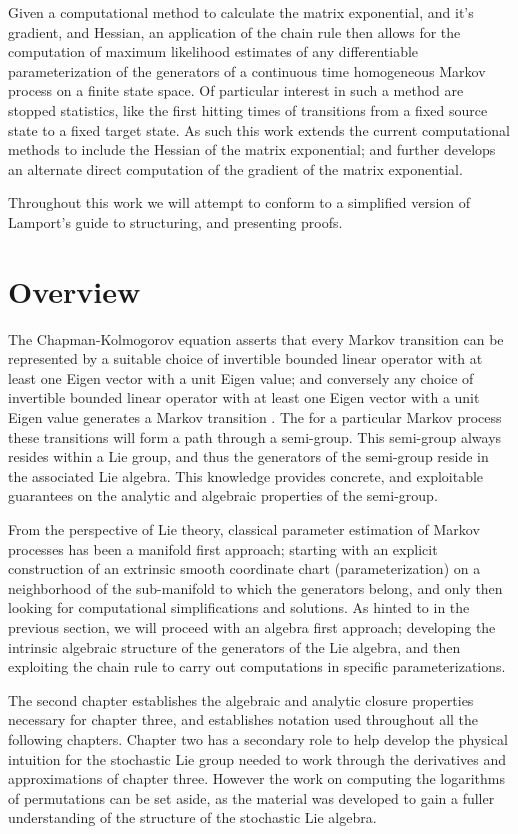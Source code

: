 Given a computational method to calculate the matrix exponential, and it's gradient, and
Hessian, an application of the chain rule then allows for the computation of maximum
likelihood estimates of any differentiable parameterization of the generators of a
continuous time homogeneous Markov process on a finite state space. Of particular interest
in such a method are stopped statistics, like the first hitting times of transitions from a
fixed source state to a fixed target state. As such this work extends the current
computational methods to include the Hessian of the matrix exponential; and further develops
an alternate direct computation of the gradient of the matrix exponential.

Throughout this work we will attempt to conform to a simplified version of Lamport's guide
to structuring, and presenting proofs\cite{lamport_how_2012}.
\section{Overview}
The Chapman-Kolmogorov equation asserts that every Markov transition can be represented by 
a suitable choice of invertible bounded linear operator with at least one Eigen vector with 
a unit Eigen value; and conversely any choice of invertible bounded linear operator with at
least one Eigen vector with a unit Eigen value generates a Markov transition \cite{rogers_diffusions_2000}.
The for a particular Markov process these transitions will form a path through a semi-group.
This semi-group always resides within a Lie group, and thus the generators of the semi-group
reside in the associated Lie algebra. This knowledge provides concrete, and exploitable 
guarantees on the analytic and algebraic properties of the semi-group.

From the perspective of Lie theory, classical parameter estimation of Markov processes has
been a manifold first approach; starting with an explicit construction of an extrinsic
smooth coordinate chart (parameterization) on a neighborhood of the sub-manifold to which
the generators belong, and only then looking for computational simplifications and
solutions. As hinted to in the previous section, we will proceed with an algebra first
approach; developing the intrinsic algebraic structure of the generators of the Lie algebra,
and then exploiting the chain rule to carry out computations in specific parameterizations.

The second chapter establishes the algebraic and analytic closure properties necessary for 
chapter three, and establishes notation used throughout all the following chapters. Chapter
two has a secondary role to help develop the physical intuition for the stochastic Lie group
needed to work through the derivatives and approximations of chapter three. However the work
on computing the logarithms of permutations can be set aside, as the material was developed
to gain a fuller understanding of the structure of the stochastic Lie algebra.

